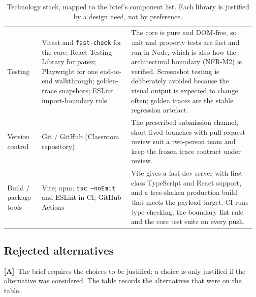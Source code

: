 \documentclass[11pt,a4paper]{article}
\newcommand{\A}{\textcolor{asmc}{\textbf{[A]}}}     %
\newcommand{\ct}[1]{\texttt{#1}}
\begin{document}
\begin{table}[H]
\begin{tabular}{@{}L{3.0cm}L{3.6cm}L{8.4cm}@{}}
Testing & Vitest and \ct{fast-check} for the core; React Testing Library for panes; Playwright for
one end-to-end walkthrough; golden-trace snapshots; ESLint import-boundary rule &
The core is pure and DOM-free, so unit and property tests are fast and run in Node, which is also
how the architectural boundary (NFR-M2) is verified. Screenshot testing is deliberately avoided
because the visual output is expected to change often; golden traces are the stable regression
artefact. \\
Version control & Git / GitHub (Classroom repository) &
The prescribed submission channel; short-lived branches with pull-request review suit a
two-person team and keep the frozen trace contract under review. \\
Build / package tools & Vite; npm; \ct{tsc --noEmit} and ESLint in CI; GitHub Actions &
Vite gives a fast dev server with first-class TypeScript and React support, and a tree-shaken
production build that meets the payload target. CI runs type-checking, the boundary lint rule and
the core test suite on every push. \\
\bottomrule
\end{tabular}
\caption{Technology stack, mapped to the brief's component list. Each library is justified by a
design need, not by preference.}
\end{table}

\subsection{Rejected alternatives}

\A\ The brief requires the choices to be justified; a choice is only justified if the alternative
was considered. The table records the alternatives that were on the table.
\end{document}
